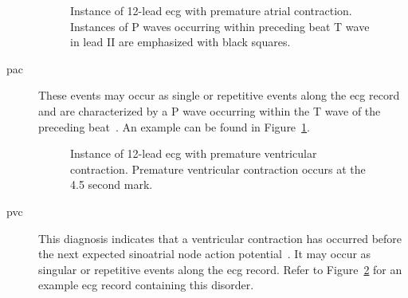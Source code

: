 \documentclass[\main/thesis.tex]{subfiles}
\begin{document}
\begin{description}
    \begin{figure}[H]
        \centering
        \caption{Instance of 12-lead \gls{ecg} with premature atrial contraction. Instances of P waves occurring within preceding beat T wave in lead II are emphasized with black squares.}
        \label{fig:full_PAC}
    \end{figure}
    \item[\gls{pac}] These events may occur as single or repetitive events along the \gls{ecg} record and are characterized by a P wave occurring within the T wave of the preceding beat~\cite{ecg-utah-lesson}.
    An example can be found in Figure~\ref{fig:full_PAC}.
 
    \begin{figure}[H]
        \centering
        \caption{Instance of 12-lead \gls{ecg} with premature ventricular contraction. Premature ventricular contraction occurs at the 4.5 second mark.}
        \label{fig:full_PVC}
    \end{figure}
    \item[\gls{pvc}] This diagnosis indicates that a ventricular contraction has occurred before the next expected sinoatrial node action potential~\cite{surawicz_borys_ahaaccfhrs_2009}. It may occur as singular or repetitive events along the \gls{ecg} record.
    Refer to Figure~\ref{fig:full_PVC} for an example \gls{ecg} record containing this disorder.


\end{description}
\end{document}
